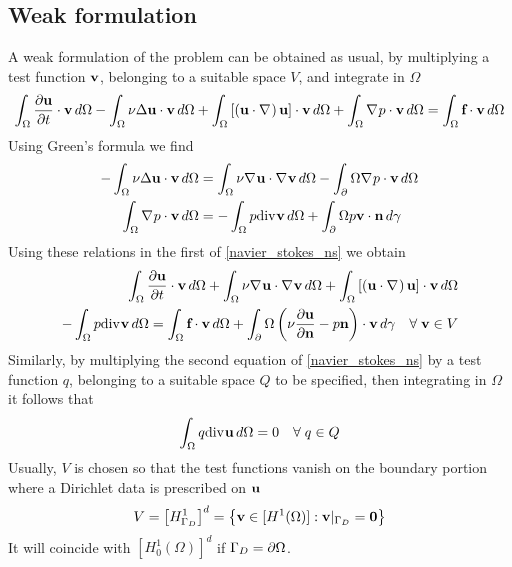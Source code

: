 \subsection{Weak formulation}
A weak formulation of the problem can be obtained as usual, by multiplying a test function \(\textbf{v}\), belonging to a suitable space \(V\), and integrate in \(\Omega\)
\begin{equation}
    \begin{split}
        \int_\Omega \partialderivative{\uvec}{t} \cdot \vvec \, d\Omega - \int_\Omega \nu \Delta \uvec \cdot \vvec \, d\Omega + \int_\Omega \left[ \left( \uvec \cdot \grad \right) \uvec \right] \cdot \vvec \, d\Omega + \int_\Omega \grad p \cdot \vvec \, d\Omega 
        = \int_\Omega \vect{f} \cdot \vvec \, d\Omega
    \end{split}
\end{equation}
Using Green's formula we find 
\begin{align*}
    -\int_\Omega \nu \Delta \textbf{u} \cdot \textbf{v} \, d\Omega &= \int_\Omega \nu \nabla\mspace{1mu} \textbf{u} \cdot \nabla\mspace{1mu} \textbf{v} \, d\Omega - \int_\partial\Omega \nabla\mspace{1mu} p \cdot \textbf{v} \, d\Omega \\
    \int_\Omega \nabla\mspace{1mu} p \cdot \textbf{v} \, d\Omega &= - \int_\Omega p \text{div}\mspace{1mu} \textbf{v} \, d\Omega + \int_\partial\Omega p \textbf{v} \cdot \textbf{n} \, d\gamma
\end{align*}
Using these relations in the first of \eqref{navier_stokes_ns} we obtain 
\begin{equation}
    \begin{split}
        \int_\Omega \partialderivative{\uvec}{t} \cdot \vvec \, d\Omega + \int_\Omega \nu \grad \uvec \cdot\grad \vvec \, d\Omega  + \int_\Omega \left[ \left( \uvec \cdot \grad \right) \uvec \right] \cdot \vvec \, d\Omega \\
        - \int_\Omega p\div \vvec \, d\Omega = \int_\Omega \vect{f} \cdot \vvec \, d\Omega + \int_\boundary \left( \nu \partialderivative{\uvec}{\normal} - p\normal \right) \cdot \vvec \, d\gamma \quad \forall \; \vvec \in V
    \end{split}
    \label{first_weak_formulation_ns}
\end{equation}
Similarly, by multiplying the second equation of \eqref{navier_stokes_ns} by a test function \(q\), belonging to a suitable space \(Q\) to be specified, then integrating in \(\Omega\) it follows that 
\begin{equation}
    \int_\Omega q \text{div}\mspace{1mu} \textbf{u} \, d\Omega = 0 \quad \forall \; q \in Q
    \label{weak_formulation_div_ns}
\end{equation}
Usually, \(V\) is chosen so that the test functions vanish on the boundary portion where a Dirichlet data is prescribed on \(\textbf{u}\)
\begin{equation}
    V = \left[ H^1_{\Gamma_D} \right]^d = \left\{ \textbf{v} \in [H^1(\Omega)] : \textbf{v}\vert_{\Gamma_D} = \textbf{0}\right\}
    \label{space_galerkin_ns}
\end{equation}
It will coincide with \(\left[ H^1_0(\Omega) \right]^d\) if \(\Gamma_D = \partial\Omega\). 

